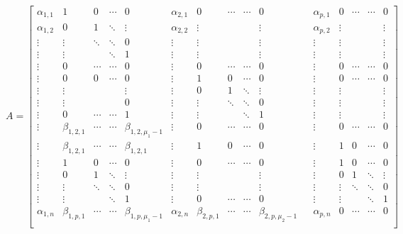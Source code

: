 \documentclass[11pt,letterpaper,twoside,openright]{report}
\begin{document}
\begin{equation}
A=\left[
\begin{array}{ccccc|ccccc|c|ccccc}
\alpha_{1,1} & 1 & 0 & \cdots & 0   	 & \alpha_{2,1} & 0 & \cdots & \cdots & 0    		&  & \alpha_{p,1} & 0 & \cdots & \cdots & 0 \\
\alpha_{1,2} & 0 & 1 & \ddots & \vdots   & \alpha_{2,2} & \vdots &  &  & \vdots     		&  & \alpha_{p,2} & \vdots &  &  & \vdots \\
\vdots & \vdots & \ddots & \ddots & 0    & \vdots & \vdots &  &  & \vdots    				&  & \vdots & \vdots &  &  & \vdots \\
\vdots & \vdots &  & \ddots & 1          & \vdots & \vdots &  &  & \vdots   			    &  & \vdots & \vdots &  &  & \vdots \\
\vdots & 0 & \cdots & \cdots & 0         & \vdots & 0 & \cdots & \cdots & 0   			    &  & \vdots & 0 & \cdots & \cdots & 0 \\
\hline
\vdots & 0 & 0 & \cdots & 0    			 & \vdots & 1 & 0 & \cdots & 0    					&  & \vdots & 0 & \cdots & \cdots & 0 \\
\vdots & \vdots &  &  & \vdots    & \vdots & 0 & 1 & \ddots & \vdots   			    &  & \vdots & \vdots &  &  & \vdots \\
\vdots & \vdots &  &  & 0    & \vdots & \vdots & \ddots & \ddots & 0 		    &  & \vdots & \vdots &  &  & \vdots \\
\vdots & 0 & \cdots & \cdots & 1    		 & \vdots & \vdots &  & \ddots & 1   			    &  & \vdots & \vdots &  &  & \vdots \\
\vdots & \beta_{1,2,1}  & \cdots & \cdots & \beta_{1,2,\mu_{1}-1}          & \vdots & 0 & \cdots & \cdots & 0    				&  & \vdots & 0 & \cdots & \cdots & 0 \\
\hline
\vdots & \beta_{1,2,1} & \cdots & \cdots & \beta_{1,2,1}    & \vdots & 1 & 0 & \cdots & 0   &  & \vdots & 1 & 0 & \cdots & 0 \\
\hline
\vdots & 1 & 0 & \cdots & 0    			 & \vdots & 0 & \cdots & \cdots & 0  				&  & \vdots & 1 & 0 & \cdots & 0 \\
\vdots & 0 & 1 & \ddots & \vdots   		 & \vdots & \vdots &  &  & \vdots    		    	&  & \vdots & 0 & 1 & \ddots & \vdots \\
\vdots & \vdots & \ddots & \ddots & 0    & \vdots & \vdots &  &  & \vdots    				&  & \vdots & \vdots & \ddots & \ddots & 0 \\
\vdots & \vdots &  & \ddots & 1   		 & \vdots & 0 & \cdots & \cdots & 0    				&  & \vdots & \vdots &  & \ddots & 1 \\
\alpha_{1,n} & \beta_{1,p,1} & \cdots & \cdots & \beta_{1,p,\mu_1-1}    & \alpha_{2,n} & \beta_{2,p,1} & \cdots & \cdots & \beta_{2,p,\mu_2-1}    &  & \alpha_{p,n} & 0 & \cdots & \cdots & 0 \\
\end{array}
\right]
\end{equation}
\end{document}
